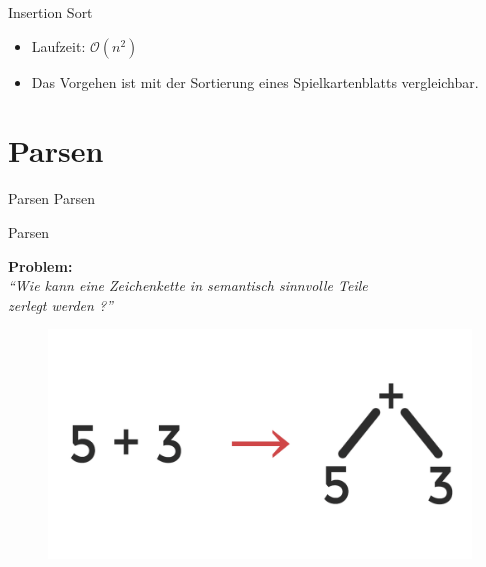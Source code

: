 \documentclass[18pt]{beamer}
\newcommand{\quotes}[1]{``#1''}
\begin{document}
\begin{frame}{Insertion Sort}
    \begin{itemize}
        \item Laufzeit: $\mathcal{O}(n^2)$
        \item Das Vorgehen ist mit der Sortierung eines Spielkartenblatts vergleichbar.
    \end{itemize}
\end{frame}

%
%

\section{Parsen}

\begin{frame}{Parsen}
    \center
    \Huge{Parsen}
\end{frame}

\begin{frame}{Parsen}
    \begin{block}{}
        \textbf{Problem:}\\
        \textit{\quotes{Wie kann eine Zeichenkette in semantisch sinnvolle Teile\\ zerlegt werden ?}}
    \end{block}
    \vspace{.2in}
    \begin{figure}
        \includegraphics[scale=.1]{img/syntax-tree-basics.png}
    \end{figure}
\end{frame}
\end{document}
